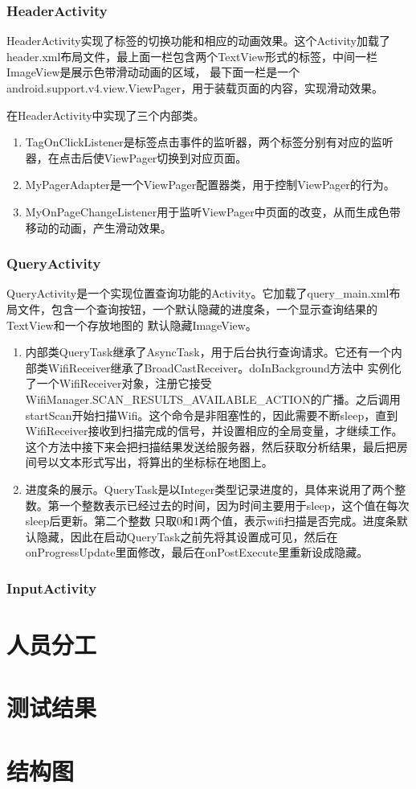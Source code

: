 \documentclass[a4paper,10pt]{article}
\begin{document}
\begin{CJK*}{UTF8}{gbsn}
    \subsubsection{HeaderActivity}
    HeaderActivity实现了标签的切换功能和相应的动画效果。这个Activity加载了header.xml布局文件，最上面一栏包含两个TextView形式的标签，中间一栏ImageView是展示色带滑动动画的区域，
    最下面一栏是一个android.support.v4.view.ViewPager，用于装载页面的内容，实现滑动效果。
    
    在HeaderActivity中实现了三个内部类。
    \begin{enumerate}[1)]
     \item TagOnClickListener是标签点击事件的监听器，两个标签分别有对应的监听器，在点击后使ViewPager切换到对应页面。
     \item MyPagerAdapter是一个ViewPager配置器类，用于控制ViewPager的行为。
     \item MyOnPageChangeListener用于监听ViewPager中页面的改变，从而生成色带移动的动画，产生滑动效果。
    \end{enumerate}

    \subsubsection{QueryActivity}
    QueryActivity是一个实现位置查询功能的Activity。它加载了query\_main.xml布局文件，包含一个查询按钮，一个默认隐藏的进度条，一个显示查询结果的TextView和一个存放地图的
    默认隐藏ImageView。%
    \begin{enumerate}[1)]
     \item 内部类QueryTask继承了AsyncTask，用于后台执行查询请求。它还有一个内部类WifiReceiver继承了BroadCastReceiver。doInBackground方法中
     实例化了一个WifiReceiver对象，注册它接受WifiManager.SCAN\_RESULTS\_AVAILABLE\_ACTION的广播。之后调用startScan开始扫描Wifi。这个命令是非阻塞性的，因此需要不断sleep，直到
     WifiReceiver接收到扫描完成的信号，并设置相应的全局变量，才继续工作。这个方法中接下来会把扫描结果发送给服务器，然后获取分析结果，最后把房间号以文本形式写出，将算出的坐标标在地图上。
     \item 进度条的展示。QueryTask是以Integer类型记录进度的，具体来说用了两个整数。第一个整数表示已经过去的时间，因为时间主要用于sleep，这个值在每次sleep后更新。第二个整数
     只取0和1两个值，表示wifi扫描是否完成。进度条默认隐藏，因此在启动QueryTask之前先将其设置成可见，然后在onProgressUpdate里面修改，最后在onPostExecute里重新设成隐藏。
    \end{enumerate}

    \subsubsection{InputActivity}
\section{人员分工}
\section{测试结果}
\section{结构图}
\end{CJK*}
\end{document}
